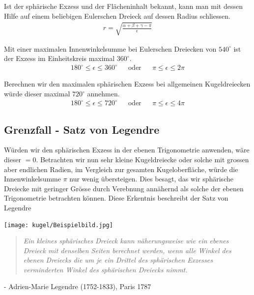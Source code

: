 \begin{refsection}
Ist der sphärische Exzess und der Flächeninhalt bekannt, kann man mit dessen Hilfe auf einem beliebigen Eulerschen Dreieck auf dessen Radius schliessen.
\begin{align*}
r = \sqrt{\frac{\alpha + \beta + \gamma - \pi}{\epsilon}}
\end{align*}

Mit einer maximalen Innenwinkelsumme bei Eulerschen Dreiecken von $540^{\circ}$ ist der Exzess im Einheitskreis maximal $360^{\circ}$.
\[
\begin{aligned}
180^{\circ} \le \epsilon \le 360^{\circ}
&
&\text{oder}
&
&\pi \le \epsilon \le 2\pi
\end{aligned}
\]

Berechnen wir den maximalen sphärischen Exzess bei allgemeinen Kugeldreiecken würde dieser maximal $720^{\circ}$ annehmen.
\[
\begin{aligned}
180^{\circ} \le \epsilon \le 720^{\circ}
&
&\text{oder}
&
&\pi \le \epsilon \le 4\pi
\end{aligned}
\]



\subsection{Grenzfall - Satz von Legendre}
Würden wir den sphärischen Exzess in der ebenen Trigonometrie anwenden, wäre dieser $=0$. Betrachten wir nun sehr kleine Kugeldreiecke oder solche mit grossen aber endlichen Radien, im Vergleich zur gesamten Kugeloberfläche, würde die Innenwinkelsumme $\pi$ nur wenig übersteigen. Dies besagt, das wir sphärische Dreiecke mit geringer Grösse durch Verebnung annähernd als solche der ebenen Trigonometrie betrachten können. Diese Erkentnis beschreibt der Satz von Legendre

\begin{center}
        \texttt{[image: kugel/Beispielbild.jpg]}
\end{center}

\begin{quote} \textit{Ein kleines sphärisches Dreieck kann näherungsweise 
wie ein ebenes Dreieck mit denselben Seiten berechnet 
werden, wenn alle Winkel des ebenen Dreiecks die um 
je ein Drittel des sphärischen Exzesses verminderten 
Winkel des sphärischen Dreiecks nimmt.} \end{quote}
\begin{flushright} - Adrien-Marie Legendre (1752-1833), Paris 1787
\end{flushright}


\end{refsection}
